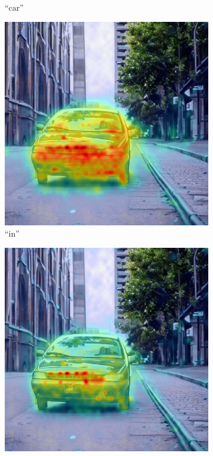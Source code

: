 \begin{figure}
\begin{subfigure}{0.32\columnwidth}
   \caption{``car''}
   \label{fig:daam-example-image-3}
  \end{subfigure}
  \begin{subfigure}{0.32\columnwidth}
   \includegraphics[width=\columnwidth]{img/3-methodology/example_daam_heatmap_in.png}
   \caption{``in''}
   \label{fig:daam-example-image-4}
  \end{subfigure}
  \begin{subfigure}{0.32\columnwidth}
   \includegraphics[width=\columnwidth]{img/3-methodology/example_daam_heatmap_an.png}

\end{subfigure}
\end{figure}
